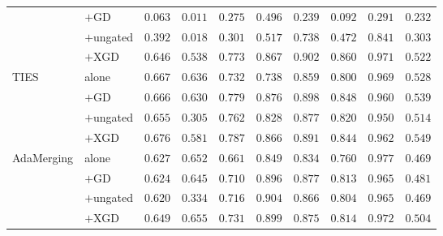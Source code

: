 \documentclass{article} %
\begin{document}
\begin{table}[p]
\begin{tabular}{llcccccccc}
          & $+$GD & $0.063$ & $0.011$ & $0.275$ & $0.496$ & $0.239$ & $0.092$ & $0.291$ & $0.232$ \\
          & $+$ungated & $0.392$ & $0.018$ & $0.301$ & $0.517$ & $0.738$ & $0.472$ & $0.841$ & $0.303$ \\
          & $+$XGD & $0.646$ & $0.538$ & $0.773$ & $0.867$ & $0.902$ & $0.860$ & $0.971$ & $0.522$ \\
\midrule
TIES & alone & $0.667$ & $0.636$ & $0.732$ & $0.738$ & $0.859$ & $0.800$ & $0.969$ & $0.528$ \\
     & $+$GD & $0.666$ & $0.630$ & $0.779$ & $0.876$ & $0.898$ & $0.848$ & $0.960$ & $0.539$ \\
     & $+$ungated & $0.655$ & $0.305$ & $0.762$ & $0.828$ & $0.877$ & $0.820$ & $0.950$ & $0.514$ \\
     & $+$XGD & $0.676$ & $0.581$ & $0.787$ & $0.866$ & $0.891$ & $0.844$ & $0.962$ & $0.549$ \\
\midrule
AdaMerging & alone & $0.627$ & $0.652$ & $0.661$ & $0.849$ & $0.834$ & $0.760$ & $0.977$ & $0.469$ \\
           & $+$GD & $0.624$ & $0.645$ & $0.710$ & $0.896$ & $0.877$ & $0.813$ & $0.965$ & $0.481$ \\
           & $+$ungated & $0.620$ & $0.334$ & $0.716$ & $0.904$ & $0.866$ & $0.804$ & $0.965$ & $0.469$ \\
           & $+$XGD & $0.649$ & $0.655$ & $0.731$ & $0.899$ & $0.875$ & $0.814$ & $0.972$ & $0.504$ \\
\bottomrule
\end{tabular}
\end{table}
\end{document}
